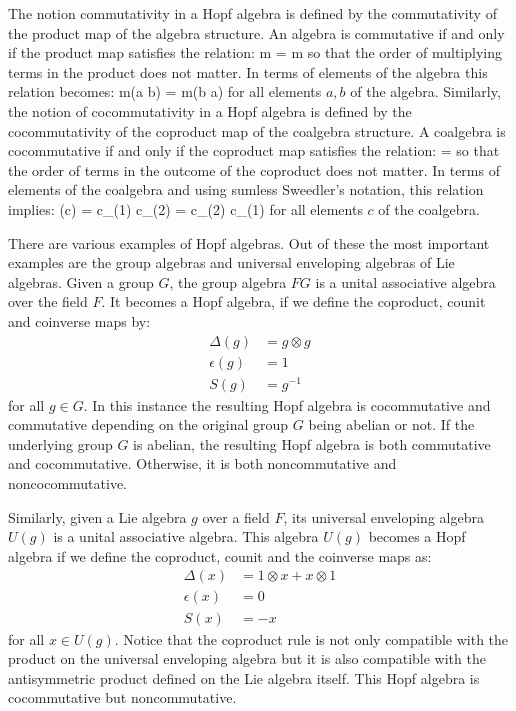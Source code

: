 The notion commutativity in a Hopf algebra is defined by the commutativity of the product
map of the algebra structure. An algebra is commutative if and only if the product map
satisfies the relation:
\beq
m = m \circ \tau
\eeq
so that the order of multiplying terms in the product does not matter. In terms of
elements of the algebra this relation becomes:
\beq
m(a \otimes b) = m(b \otimes a)
\eeq
for all elements $a,b$ of the algebra. Similarly, the
notion of cocommutativity in a Hopf algebra is defined by the cocommutativity of the
coproduct map of the coalgebra structure. A coalgebra is cocommutative if and only if
the coproduct map satisfies the relation:
\beq
\Delta = \tau \circ \Delta
\eeq
so that the order of terms in the outcome of the coproduct does not matter. In
terms of elements of the coalgebra and using sumless Sweedler's notation, this
relation implies:
\beq
\Delta(c) = c_{(1)} \otimes c_{(2)} = c_{(2)} \otimes c_{(1)}
\eeq
for all elements $c$ of the coalgebra.

There are various examples of Hopf algebras. Out of these the most important examples
are the group algebras and universal enveloping algebras of Lie algebras. Given a
group $G$, the group algebra $FG$ is a unital associative algebra over the field $F$.
It becomes a Hopf algebra, if we define the coproduct, counit and coinverse maps by:
\begin{align}
\Delta(g) & = g \otimes g \\
\epsilon(g) & = 1 \\
S(g) & = g^{-1}
\end{align}
for all $g \in G$. In this instance the resulting Hopf algebra is cocommutative and
commutative depending on the original group $G$ being abelian or not. If the
underlying group $G$ is abelian, the resulting Hopf algebra is both commutative
and cocommutative. Otherwise, it is both noncommutative and noncocommutative.

Similarly, given a Lie algebra $g$ over a field $F$, its universal enveloping algebra
$U(g)$ is a unital associative algebra. This algebra $U(g)$ becomes a Hopf algebra
if we define the coproduct, counit and the coinverse maps as:
\begin{align}
\Delta(x) & = 1 \otimes x + x \otimes 1 \\
\epsilon(x) & = 0 \\
S(x) & = -x
\end{align}
for all $x \in U(g)$. Notice that the coproduct rule is not only compatible with the
product on the universal enveloping algebra but it is also compatible with the
antisymmetric product defined on the Lie algebra itself. This Hopf algebra is
cocommutative but noncommutative.

